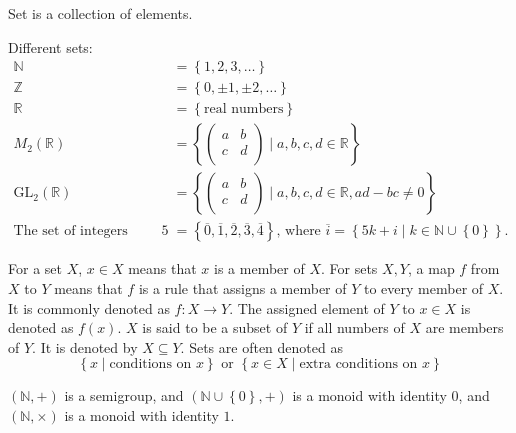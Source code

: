 Set is a collection of elements. 
\begin{eg}
    Different sets:
\begin{align*}
    \mathbb{N} &= \left\{ 1,2,3,\dots  \right\} \\
    \mathbb{Z} &= \left\{ 0, \pm 1, \pm 2, \dots  \right\} \\
    \mathbb{R} &= \left\{ \text{real numbers} \right\} \\
    M_2(\mathbb{R} ) &= \left\{ \begin{pmatrix}
        a & b  \\
        c & d  \\
    \end{pmatrix} \mid a,b,c,d \in \mathbb{R}  \right\}  \\
    \mathrm{GL} _2(\mathbb{R}) &= \left\{ \begin{pmatrix}
        a & b  \\
        c & d  \\
    \end{pmatrix} \mid a,b,c,d \in \mathbb{R} , ad - bc \neq 0\right\} \\
    \text{The set of integers modulo } 5 &= \left\{ \overline{0}, \overline{1}, \overline{2}, \overline{3}, \overline{4} \right\} \text{, where } \overline{i} = \left\{ 5k + i \mid k \in \mathbb{N} \cup \left\{ 0 \right\}   \right\}.
\end{align*}
\end{eg}

\begin{notation}
    For a set \(X\), \(x \in X\) means that \(x\) is a member of \(X\). For sets \(X, Y\), a map \(f\) from \(X\) to \(Y\) means that \(f\) is a rule that assigns a member of \(Y\) to every member of \(X\). It is commonly denoted as \(f: X \to Y\). The assigned element of \(Y\) to \(x \in X\) is denoted as \(f(x)\).     \(X\) is said to be a subset of \(Y\) if all numbers of \(X\) are members of \(Y\). It is denoted by \(X \subseteq Y\). Sets are often denoted as 
    \[
        \left\{ x \mid \text{conditions on } x \right\} \text{ or } \left\{ x \in X \mid \text{extra conditions on } x \right\} 
    \]                
\end{notation}

\begin{eg}
    \((\mathbb{N} , +)\) is a semigroup, and \((\mathbb{N} \cup \left\{ 0 \right\}  , +)\) is a monoid with identity \(0\), and \((\mathbb{N} , \times )\) is a monoid with identity \(1\).  
\end{eg}

